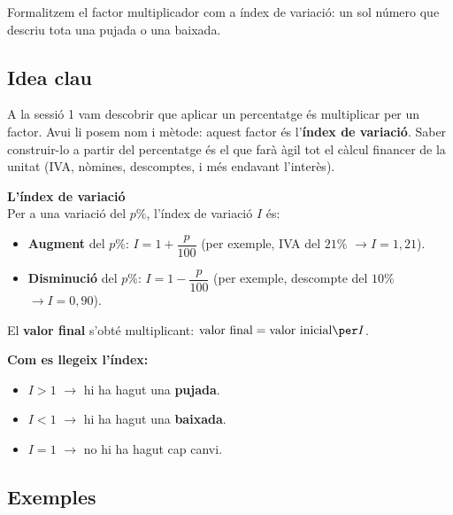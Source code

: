 %
{Formalitzem el factor multiplicador com a índex de variació: un sol número que descriu tota una pujada o una baixada.}

\subsection{Idea clau}

A la sessió 1 vam descobrir que aplicar un percentatge és multiplicar per un factor.
Avui li posem nom i mètode: aquest factor és l'\textbf{índex de variació}. Saber
construir-lo a partir del percentatge és el que farà àgil tot el càlcul financer de la
unitat (IVA, nòmines, descomptes, i més endavant l'interès).

\begin{idea}
\textbf{L'índex de variació}\\
Per a una variació del $p\%$, l'índex de variació $I$ és:
\begin{itemize}[leftmargin=1.4em, itemsep=3pt]
  \item \textbf{Augment} del $p\%$: \quad $I=1+\dfrac{p}{100}$ \quad (per exemple, IVA
        del $21\%$ $\rightarrow I=1,21$).
  \item \textbf{Disminució} del $p\%$: \quad $I=1-\dfrac{p}{100}$ \quad (per exemple,
        descompte del $10\%$ $\rightarrow I=0,90$).
\end{itemize}
El \textbf{valor final} s'obté multiplicant: \quad
$\text{valor final}=\text{valor inicial}\per I$.
\smallskip

\textbf{Com es llegeix l'índex:}
\begin{itemize}[leftmargin=1.4em, itemsep=1pt]
  \item $I>1$ $\rightarrow$ hi ha hagut una \textbf{pujada}.
  \item $I<1$ $\rightarrow$ hi ha hagut una \textbf{baixada}.
  \item $I=1$ $\rightarrow$ no hi ha hagut cap canvi.
\end{itemize}
\end{idea}

\subsection{Exemples}

